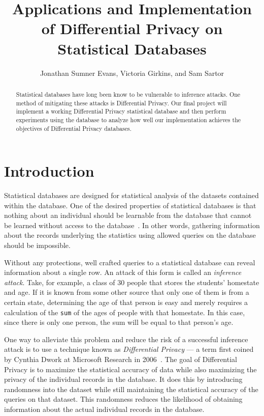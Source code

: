 \documentclass[12pt]{IEEEtran}
\title{Applications and Implementation of Differential Privacy on Statistical
Databases}
\author{Jonathan Sumner Evans, Victoria Girkins, and Sam Sartor}
\begin{document}
\maketitle

\begin{abstract}
Statistical databases have long been know to be vulnerable to inference attacks.
One method of mitigating these attacks is Differential Privacy. Our final
project will implement a working Differential Privacy statistical database and
then perform experiments using the database to analyze how well our
implementation achieves the objectives of Differential Privacy databases.
\end{abstract}

\section{Introduction}
Statistical databases are designed for statistical analysis of the datasets
contained within the database. One of the desired properties of statistical
databases is that nothing about an individual should be learnable from the
database that cannot be learned without access to the
database~\cite{Dwork:2006:DP}. In other words, gathering information about the
records underlying the statistics using allowed queries on the database should
be impossible.

Without any protections, well crafted queries to a statistical database can
reveal information about a single row. An attack of this form is called an
\textit{inference attack}. Take, for example, a class of 30 people that stores
the students' homestate and age.  If it is known from some other source that
only one of them is from a certain state, determining the age of that person is
easy and merely requires a calculation of the \texttt{sum} of the ages of people
with that homestate. In this case, since there is only one person, the sum will
be equal to that person's age.

One way to alleviate this problem and reduce the risk of a successful inference
attack is to use a technique known as \textit{Differential Privacy} --- a term
first coined by Cynthia Dwork at Microsoft Research in
2006~\cite{Hilton:DP:history}. The goal of Differential Privacy is to maximize
the statistical accuracy of data while also maximizing the privacy of the
individual records in the database. It does this by introducing randomness into
the dataset while still maintaining the statistical accuracy of the queries on
that dataset. This randomness reduces the likelihood of obtaining information
about the actual individual records in the database.
\end{document}
